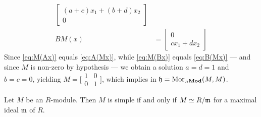 \begin{example}
\begin{align}
  \begin{bmatrix}
    (a + c) x_1 + (b + d) x_2 \\
    0
  \end{bmatrix}
  \\ %
  \label{eq:B(Mx)}
  B M(x) &=
  \begin{bmatrix}
    0 \\
    c x_1 + d x_2
  \end{bmatrix}
\end{align}
Since \cref{eq:M(Ax)} equals \cref{eq:A(Mx)}, while \cref{eq:M(Bx)} equals
\cref{eq:B(Mx)} --- and since \(M\) is non-zero by hypothesis --- we obtain a
solution \(a = d = 1\) and \(b = c = 0\), yielding
\(M = \big[
\begin{smallmatrix}
  1 & 0 \\
  0 & 1
\end{smallmatrix}
\big]\), which implies in \(\mathfrak{h} = \operatorname{Mor}_{{{}_{R}\textbf{Mod}}}(M, M)\).
\end{example}

\begin{proposition}
\label{prop:simple-mod-iff-iso-R/a-with-maximal}
Let \(M\) be an \(R\)-module. Then \(M\) is simple if and only if \(M \simeq
R/\mathfrak{m}\) for a maximal ideal \(\mathfrak{m}\) of \(R\).
\end{proposition}

